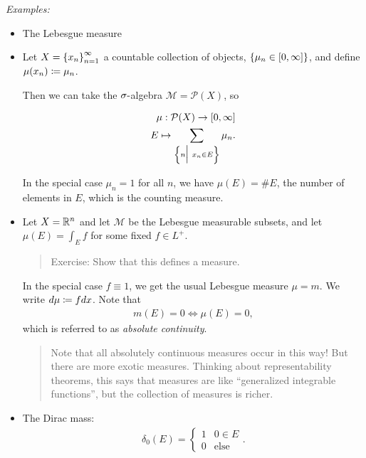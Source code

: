 \emph{Examples:}

\begin{itemize}
\item
  The Lebesgue measure
\item
  Let \(X = \left\{{x_n}\right\}_{n=1}^\infty\) a countable collection of
  objects, \(\left\{{\mu_n \in [0,\infty]}\right\}\), and define
  \(\mu(x_n) \coloneqq \mu_n\).

  Then we can take the \(\sigma{\hbox{-}}\)algebra
  \(\mathcal M = \mathcal P(X)\), so

  \begin{align*}
  \mu: \mathcal P(X) \to [0, \infty] \\
  E \mapsto \sum_{\left\{{n \mathrel{\Big|}~ x_n \in E}\right\}} \mu_n
  .\end{align*}

  In the special case \(\mu_n = 1\) for all \(n\), we have
  \(\mu(E) = \# E\), the number of elements in \(E\), which is the
  counting measure.
\item
  Let \(X = {\mathbb{R}}^n\) and let \(\mathcal M\) be the Lebesgue measurable
  subsets, and let \(\mu(E) = \int_E f\) for some fixed \(f \in L^+\).

  \begin{quote}
  Exercise: Show that this defines a measure.
  \end{quote}

  In the special case \(f \equiv 1\), we get the usual Lebesgue measure
  \(\mu = m\). We write \(d\mu \coloneqq f dx\). Note that
  \begin{align*}
  m(E) = 0 \iff \mu(E) = 0
  ,\end{align*} which is referred to as \emph{absolute continuity}.

  \begin{quote}
  Note that all absolutely continuous measures occur in this way! But
  there are more exotic measures. Thinking about representability
  theorems, this says that measures are like ``generalized integrable
  functions'', but the collection of measures is richer.
  \end{quote}
\item
  The Dirac mass:
  \begin{align*}
  \delta_0(E) = \begin{cases} 1 & 0\in E \\ 0 & \text{else}
  \end{cases}.\end{align*}
\end{itemize}

